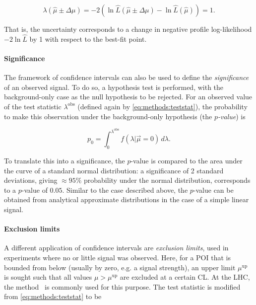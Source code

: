 \begin{equation}
    \lambda(\hat{\mu} \pm \Delta \mu) = -2 (\ln \hat{L} (\hat{\mu} \pm \Delta \mu) - \ln \hat{L} (\hat{\mu})) = 1.
\end{equation}

That is, the uncertainty corresponds to a change in negative profile log-likelihood $-2 \ln \hat{L}$ by 1 with respect to the best-fit point.

\paragraph{Significance}

The framework of confidence intervals can also be used to define the \textit{significance} of an observed signal. To do so, a hypothesis test is performed, with the background-only case as the null hypothesis to be rejected. For an observed value of the test statistic $\lambda^{\mathrm{obs}}$ (defined again by \cref{eq:methods:teststat}), the probability to make this observation under the background-only hypothesis (the \textit{$p$-value}) is

\begin{equation}
\label{eq:methods:pvalue}
    p_0 = \int_0^{\lambda^{\mathrm{obs}}} f(\lambda | \vec{\mu} = 0) \, d\lambda.
\end{equation}

To translate this into a significance, the $p$-value is compared to the area under the curve of a standard normal distribution: a significance of 2 standard deviations, giving $\approx 95\%$ probability under the normal distribution, corresponds to a $p$-value of $0.05$. Similar to the case described above, the $p$-value can be obtained from analytical approximate distributions in the case of a simple linear signal.

\paragraph{Exclusion limits}

A different application of confidence intervals are \textit{exclusion limits}, used in experiments where no or little signal was observed. Here, for a POI that is bounded from below (usually by zero, e.g. a signal strength), an upper limit $\mu^{\mathrm{up}}$ is sought such that all values $\mu > \mu^{\mathrm{up}}$ are excluded at a certain CL. At the LHC, the \CLs method~\cite{Junk:1999kv,Read:2002hq} is commonly used for this purpose. The test statistic is modified from \cref{eq:methods:teststat} to be 

